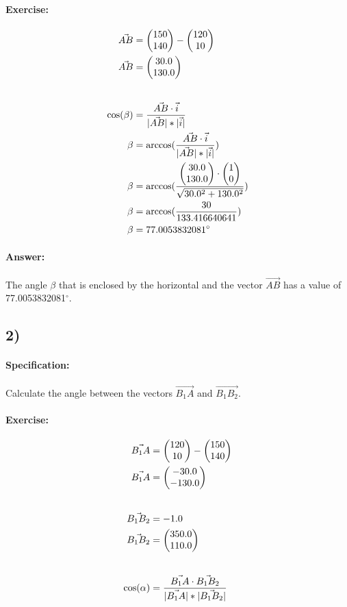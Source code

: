 \documentclass{article}
\begin{document}
\paragraph{Exercise:} 
\begin{align*}
    \vec{AB} &= \vBOne - \vA \\
    \vec{AB} &= \vAB \\[20pt]
    \cos(\beta) &= \frac{\vec{AB} \cdot \vec{i}}{|\vec{AB}| * |\vec{i}|} \\
    \beta &= \arccos(\frac{\vec{AB} \cdot \vec{i}}{|\vec{AB}| * |\vec{i}|}) \\
    \beta &= \arccos(\frac{\vAB \cdot \vI}{\sqrt{\vABX^2 + \vABY^2}}) \\
    \beta &= \arccos(\frac{30}{133.416640641}) \\
    \beta &= 77.0053832081^\circ
\end{align*}

\paragraph{Answer:} 
The angle $\beta$ that is enclosed by the horizontal and the vector $\vec{AB}$ has a value
of 77.0053832081$^\circ$.

\subsection*{2)}

\paragraph{Specification:}
Calculate the angle between the vectors $\vec{B_1A}$ and $\vec{B_1B_2}$.

\def\vBOneAX{\pgfmathparse{\pAX - \pBOneX}\pgfmathresult}
\def\vBOneAY{\pgfmathparse{\pAY - \pBOneY}\pgfmathresult}
\def\vBOneA{\begin{pmatrix}
    \vBOneAX \\ 
    \vBOneAY 
\end{pmatrix}}

\def\vBOneBTwoX{\pgfmathparse{\pBTwoX - \pBOneX}\pgfmathresult}
\def\vBOneBTwoY{\pgfmathparse{\pBTwoY - \pBOneY}\pgfmathresult}
\def\vBOneBTwo{\begin{pmatrix}
    \vBOneBTwoX \\ 
    \vBOneBTwoY
\end{pmatrix}}

\paragraph{Exercise:} 
\begin{align*}
    \vec{B_1A} &= \vA - \vBOne \\
    \vec{B_1A} &= \vBOneA  \\[20pt]
    \vec{B_1B_2} &= \pgfmathparse{1 - 2} \pgfmathresult \\
    \vec{B_1B_2} &= \vBOneBTwo \\[20pt]
    \cos(\alpha) &= \frac{\vec{B_1A} \cdot \vec{B_1B_2}}{|\vec{B_1A}| * |\vec{B_1B_2}|}
\end{align*}
\end{document}
